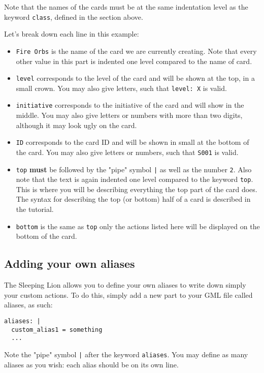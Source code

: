 \documentclass{article}
\begin{document}
Note that the names of the cards must be at the same indentation level as the keyword \verb`class`, defined in the section above.

Let's break down each line in this example:
\begin{itemize}
	\item \verb`Fire Orbs` is the name of the card we are currently creating. Note that every other value in this part is indented one level compared to the name of card.
	\item \verb`level` corresponds to the level of the card and will be shown at the top, in a small crown. You may also give letters, such that \verb`level: X` is valid.
	\item \verb`initiative` corresponds to the initiative of the card and will show in the middle. You may also give letters or numbers with more than two digits, although it may look ugly on the card.
	\item \verb`ID` corresponds to the card ID and will be shown in small at the bottom of the card. You may also give letters or numbers, such that \verb`S001` is valid.
	\item \verb`top` \textbf{must} be followed by the "pipe" symbol \verb`|` as well as the number \verb`2`. Also note that the text is again indented one level compared to the keyword \verb`top`. This is where you will be describing everything the top part of the card does. The syntax for describing the top (or bottom) half of a card is described in the tutorial.
	\item \verb`bottom` is the same as \verb`top` only the actions listed here will be displayed on the bottom of the card.
\end{itemize}

\subsection{Adding your own aliases}
The Sleeping Lion allows you to define your own aliases to write down simply your custom actions. To do this, simply add a new part to your GML file called aliases, as such:

\begin{center}
\begin{BVerbatim}
aliases: |
  custom_alias1 = something
  ...
\end{BVerbatim}
\end{center}

Note the "pipe" symbol \verb'|' after the keyword \verb'aliases'. You may define as many aliases as you wish: each alias should be on its own line.
\end{document}
